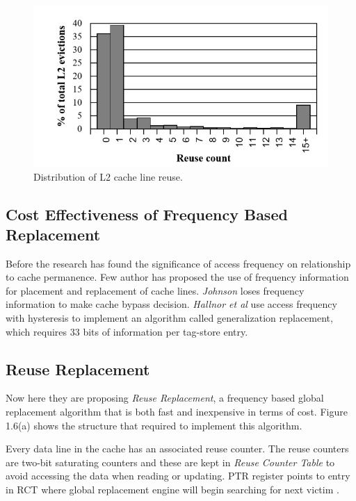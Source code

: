 \documentclass{report}
\begin{document}
\begin{figure}[h!]
\includegraphics[width=1\textwidth]{./fig5}
\caption{ Distribution of L2 cache line reuse.}
\label{fig5}
\end{figure}

 \subsection{Cost Effectiveness of Frequency Based Replacement}

Before the research has found the significance of access frequency on relationship to cache permanence. Few author has proposed the use of frequency information for placement and replacement of cache lines. \emph{Johnson} loses frequency information to make cache bypass decision. \emph{Hallnor et al }use access frequency with hysteresis to implement an algorithm called generalization replacement, which requires $33$ bits of information per tag-store entry.

\vspace{.8cm}

\subsection{ Reuse Replacement}


Now here they are proposing \emph{Reuse Replacement}, a
frequency based global replacement algorithm that is both fast and inexpensive in terms of cost. Figure 1.6(a) shows the structure that required to implement this algorithm.
\vspace{.8cm}


Every data line in the cache has an associated reuse counter. The reuse counters are two-bit saturating counters and these are kept in \emph{Reuse Counter Table} to avoid accessing the data when reading or updating. PTR register points to entry in RCT where global replacement engine will begin searching for next victim .
\end{document}
